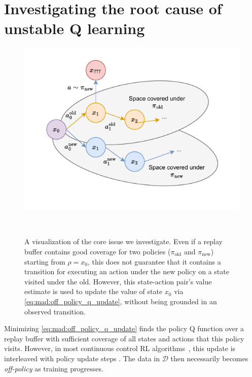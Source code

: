 \section{Investigating the root cause of unstable Q learning}

\begin{figure}[t]
\begin{minipage}{0.6\textwidth}
    \includegraphics[width=\textwidth]{illustrations/mad-td/rl_sequences.drawio.pdf}
\end{minipage}
~
\begin{minipage}{0.39\textwidth}
    \caption{A visualization of the core issue we investigate. Even if a replay buffer contains good coverage for two policies ($\pi_\mathrm{old}$ and $\pi_\mathrm{new}$) starting from $\rho=x_0$, this does not guarantee that it contains a transition for executing an action under the new policy on a state visited under the old. However, this state-action pair's value estimate is used to update the value of state $x_0$ via \autoref{eq:mad:off_policy_q_update}, without being grounded in an observed transition.}
    \label{fig:mad:mad:coverage}
\end{minipage}
\end{figure}
    

Minimizing \autoref{eq:mad:off_policy_q_update} finds the policy Q function over a replay buffer with sufficient coverage of all states and actions that this policy visits.
However, in most continuous control RL algorithms~\parencite{ddpg,haarnoja2018sac, fujimoto2018addressing}, this update is interleaved with policy update steps .
The data in $\mathcal{D}$ then necessarily becomes \emph{off-policy} as training progresses. 

